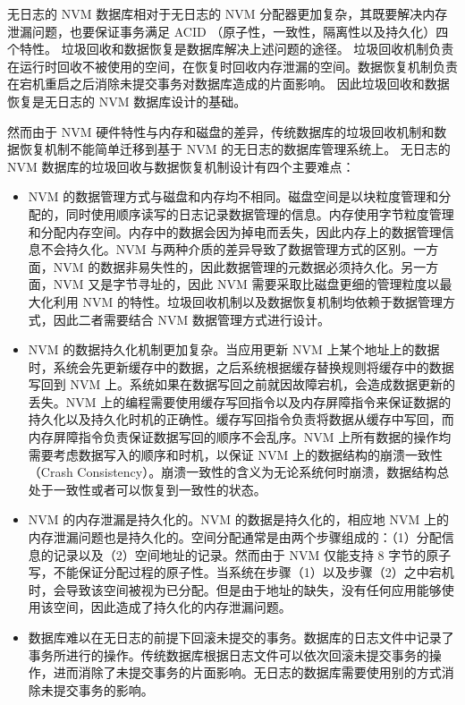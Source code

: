 无日志的 NVM 数据库相对于无日志的 NVM 分配器更加复杂，其既要解决内存泄漏问题，也要保证事务满足 ACID （原子性，一致性，隔离性以及持久化）四个特性。
垃圾回收和数据恢复是数据库解决上述问题的途径。
垃圾回收机制负责在运行时回收不被使用的空间，在恢复时回收内存泄漏的空间。数据恢复机制负责在宕机重启之后消除未提交事务对数据库造成的片面影响。
因此垃圾回收和数据恢复是无日志的 NVM 数据库设计的基础。

然而由于 NVM 硬件特性与内存和磁盘的差异，传统数据库的垃圾回收机制和数据恢复机制不能简单迁移到基于 NVM 的无日志的数据库管理系统上。
无日志的 NVM 数据库的垃圾回收与数据恢复机制设计有四个主要难点：
\begin{itemize}
    \item NVM 的数据管理方式与磁盘和内存均不相同。磁盘空间是以块粒度管理和分配的，同时使用顺序读写的日志记录数据管理的信息。内存使用字节粒度管理和分配内存空间。内存中的数据会因为掉电而丢失，因此内存上的数据管理信息不会持久化。NVM 与两种介质的差异导致了数据管理方式的区别。一方面，NVM 的数据非易失性的，因此数据管理的元数据必须持久化。另一方面，NVM 又是字节寻址的，因此 NVM 需要采取比磁盘更细的管理粒度以最大化利用 NVM 的特性。垃圾回收机制以及数据恢复机制均依赖于数据管理方式，因此二者需要结合 NVM 数据管理方式进行设计。
    \item NVM 的数据持久化机制更加复杂。当应用更新 NVM 上某个地址上的数据时，系统会先更新缓存中的数据，之后系统根据缓存替换规则将缓存中的数据写回到 NVM 上。系统如果在数据写回之前就因故障宕机，会造成数据更新的丢失。NVM 上的编程需要使用缓存写回指令以及内存屏障指令来保证数据的持久化以及持久化时机的正确性。缓存写回指令负责将数据从缓存中写回，而内存屏障指令负责保证数据写回的顺序不会乱序。NVM 上所有数据的操作均需要考虑数据写入的顺序和时机，以保证 NVM 上的数据结构的崩溃一致性（Crash Consistency）。崩溃一致性的含义为无论系统何时崩溃，数据结构总处于一致性或者可以恢复到一致性的状态。
    \item NVM 的内存泄漏是持久化的。NVM 的数据是持久化的，相应地 NVM 上的内存泄漏问题也是持久化的。空间分配通常是由两个步骤组成的：（1）分配信息的记录以及（2）空间地址的记录。然而由于 NVM 仅能支持 8 字节的原子写，不能保证分配过程的原子性。当系统在步骤（1）以及步骤（2）之中宕机时，会导致该空间被视为已分配。但是由于地址的缺失，没有任何应用能够使用该空间，因此造成了持久化的内存泄漏问题。
    \item 数据库难以在无日志的前提下回滚未提交的事务。数据库的日志文件中记录了事务所进行的操作。传统数据库根据日志文件可以依次回滚未提交事务的操作，进而消除了未提交事务的片面影响。无日志的数据库需要使用别的方式消除未提交事务的影响。

\end{itemize}

